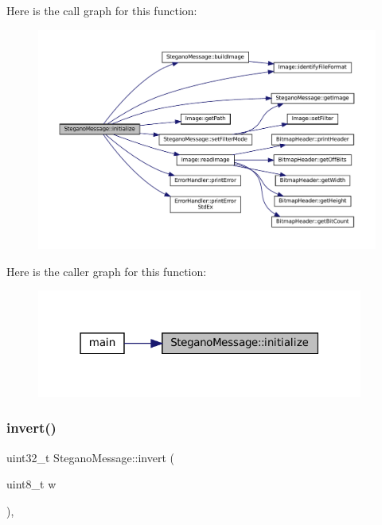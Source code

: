 Here is the call graph for this function\+:
\nopagebreak
\begin{figure}[H]
\begin{center}
\leavevmode
\includegraphics[width=350pt]{classSteganoMessage_aeb4d2b69498c148508e2ca70194679cc_cgraph}
\end{center}
\end{figure}
Here is the caller graph for this function\+:
\nopagebreak
\begin{figure}[H]
\begin{center}
\leavevmode
\includegraphics[width=304pt]{classSteganoMessage_aeb4d2b69498c148508e2ca70194679cc_icgraph}
\end{center}
\end{figure}
\mbox{\label{classSteganoMessage_af46fa3a09a19fc73c146e22d6a32657a}} 
\subsubsection{\texorpdfstring{invert()}{invert()}}
{\footnotesize\ttfamily uint32\+\_\+t Stegano\+Message\+::invert (\begin{DoxyParamCaption}\item[{uint8\+\_\+t}]{w }\end{DoxyParamCaption})\hspace{0.3cm}{\ttfamily [static]}, {\ttfamily [private]}}



